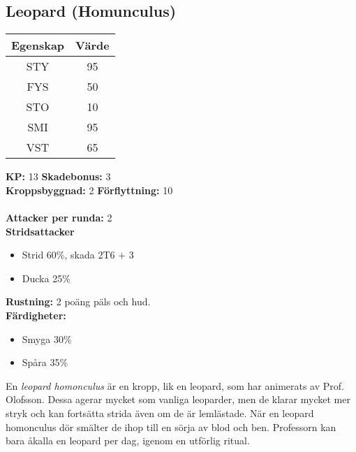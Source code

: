 \subsection{Leopard (Homunculus)}
\label{var:Leopard}
%
\begin{center}
	\begin{tabular}{ | c | c | }
		\hline
		Egenskap & Värde \\
		\hline
		STY & 95 \\
		FYS & 50 \\
		STO & 10 \\
		SMI & 95 \\
		VST & 65 \\
		\hline
	\end{tabular}
\end{center}
%
\textbf{KP:} 13 \quad \textbf{Skadebonus:} 3 \\
\textbf{Kroppsbyggnad:} 2 \quad \textbf{Förflyttning:} 10 \\
\\
\textbf{Attacker per runda:} 2 \\
\textbf{Stridsattacker}
\begin{itemize}
	\item Strid 60\%, skada 2T6 + 3
	\item Ducka 25\%
\end{itemize}
\textbf{Rustning:} 2 poäng päls och hud. \\
\textbf{Färdigheter:}
\begin{itemize}
	\item Smyga 30\%
	\item Spåra 35\%
\end{itemize}
%
En \textit{leopard homonculus} är en kropp, lik en leopard, som har animerats av Prof. Olofsson. Dessa agerar mycket som vanliga leoparder, men de klarar mycket mer stryk och kan fortsätta strida även om de är lemlästade. När en leopard homonculus dör smälter de ihop till en sörja av blod och ben. Professorn kan bara åkalla en leopard per dag, igenom en utförlig ritual.
%
